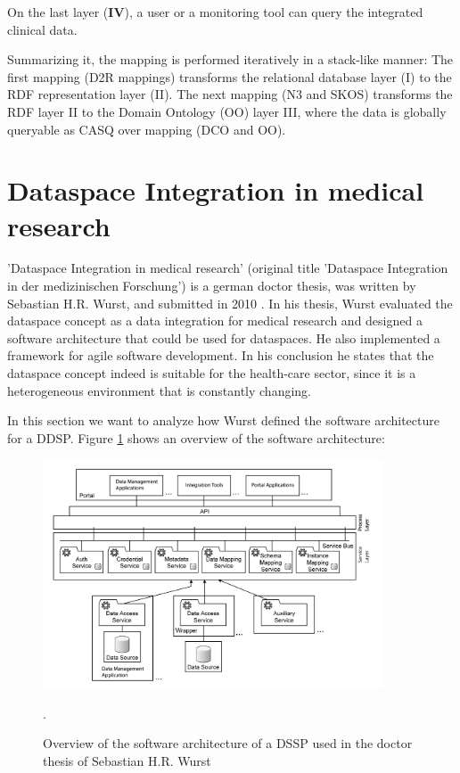 On the last layer (\textbf{IV}), a user or a monitoring tool can query the integrated clinical data.

Summarizing it, the mapping is performed iteratively in a stack-like manner:
The first mapping \textalpha (D2R mappings) transforms the relational database layer (I) to the RDF representation layer (II). The next mapping \textbeta (N3 and SKOS) transforms the RDF layer II to the Domain Ontology (OO) layer III, where the data is globally queryable as CASQ over mapping \textgamma (DCO and OO).  

\section{Dataspace Integration in medical research}

'Dataspace Integration in medical research' (original title 'Dataspace Integration in der medizinischen Forschung') is a german doctor thesis, was written by Sebastian H.R. Wurst, and submitted in 2010 \cite{WurstDiss}. In his thesis, Wurst evaluated the dataspace concept as a data integration for medical research and designed a software architecture that could be used for dataspaces. He also implemented a framework for agile software development. 
In his conclusion he states that the dataspace concept indeed is suitable for the health-care sector, since it is a heterogeneous environment that is constantly changing.

In this section we want to analyze how Wurst defined the software architecture for a DDSP. Figure \ref{SoftwareArchitectureDSSPWurst} shows an overview of the software architecture:

\begin{figure}[H]
	\begin{center}
		\includegraphics[width=0.9\textwidth]{figures/DataspaceIntegrationInDerMedForschungFigure31.PNG}
	\end{center}
	\caption{Overview of the software architecture of a DSSP used in the doctor thesis of Sebastian H.R. Wurst \cite[p. 117, Figure 31, english translation]{WurstDiss}}.
	\label{SoftwareArchitectureDSSPWurst}
\end{figure}

